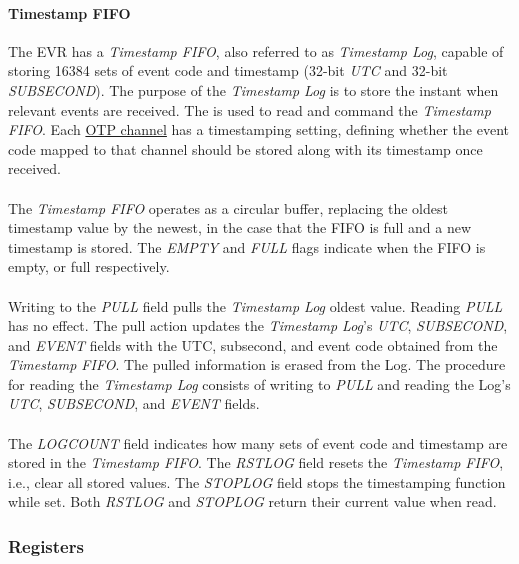 \documentclass[openany]{article}
\begin{document}
			\paragraph{Timestamp FIFO} The EVR has a \emph{Timestamp FIFO}, also referred to as \emph{Timestamp Log}, capable of storing 16384 sets of event code and timestamp (32-bit \emph{UTC} and 32-bit \emph{SUBSECOND}). The purpose of the \emph{Timestamp Log} is to store the instant when relevant events are received. The  is used to read and command the \emph{Timestamp FIFO}. Each \hyperref[sec:evr-trigger-generation]{OTP channel} has a timestamping setting, defining whether the event code mapped to that channel should be stored along with its timestamp once received.
			\paragraph{} The \emph{Timestamp FIFO} operates as a circular buffer, replacing the oldest timestamp value by the newest, in the case that the FIFO is full and a new timestamp is stored.
			The \emph{EMPTY} and \emph{FULL} flags indicate when the FIFO is empty, or full respectively.
			\paragraph{} Writing to the \emph{PULL} field pulls the \emph{Timestamp Log} oldest value. Reading \emph{PULL} has no effect. The pull action updates the \emph{Timestamp Log}'s \emph{UTC}, \emph{SUBSECOND}, and \emph{EVENT} fields with the UTC, subsecond, and event code obtained from the \emph{Timestamp FIFO}. The pulled information is erased from the Log. The procedure for reading the \emph{Timestamp Log} consists of writing to \emph{PULL} and reading the Log's \emph{UTC}, \emph{SUBSECOND}, and \emph{EVENT} fields.
			\paragraph{} The \emph{LOGCOUNT} field indicates how many sets of event code and timestamp are stored in the \emph{Timestamp FIFO}.
			The \emph{RSTLOG} field resets the \emph{Timestamp FIFO}, i.e., clear all stored values. The \emph{STOPLOG} field stops the timestamping function while set. Both \emph{RSTLOG} and \emph{STOPLOG} return their current value when read.

		\subsubsection{Registers}\label{sec:evr-registers}
\end{document}
